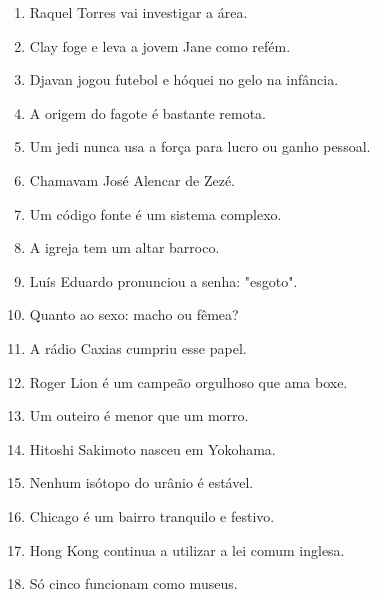 \begin{enumerate}
\item Raquel Torres vai investigar a \'area.
\item Clay foge e leva a jovem Jane como ref\'em.
\item Djavan jogou futebol e h\'oquei no gelo na inf\^ancia.
\item A origem do fagote \'e bastante remota.
\item Um jedi nunca usa a for\c{c}a para lucro ou ganho pessoal.
\item Chamavam Jos\'e Alencar de Zez\'e.
\item Um c\'odigo fonte \'e um sistema complexo.
\item A igreja tem um altar barroco.
\item Lu\'is Eduardo pronunciou a senha: "esgoto".
\item Quanto ao sexo: macho ou f\^emea?
\item A r\'adio Caxias cumpriu esse papel.
\item Roger Lion \'e um campe\~ao orgulhoso que ama boxe.
\item Um outeiro \'e menor que um morro.
\item Hitoshi Sakimoto nasceu em Yokohama.
\item Nenhum is\'otopo do ur\^anio \'e est\'avel.
\item Chicago \'e um bairro tranquilo e festivo.
\item Hong Kong continua a utilizar a lei comum inglesa.
\item S\'o cinco funcionam como museus.
\end{enumerate}


